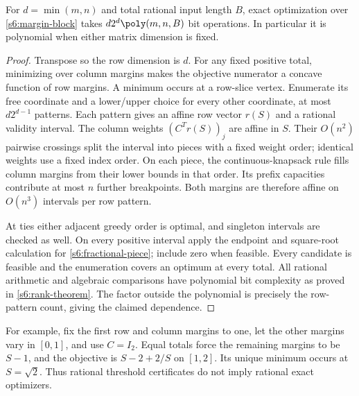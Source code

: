 \begin{theorem}\label{app:margin-fpt}
For $d=\min(m,n)$ and total rational input length $B$, exact optimization
over \eqref{s6:margin-block} takes
$d2^d\poly(m,n,B)$ bit operations. In particular it is polynomial
when either matrix dimension is fixed.
\end{theorem}
\begin{proof}
Transpose so the row dimension is $d$. For any fixed positive total,
minimizing over column margins makes the objective numerator a concave
function of row margins. A minimum occurs at a row-slice vertex.
Enumerate its free coordinate and a lower/upper choice for every other
coordinate, at most $d2^{d-1}$ patterns. Each pattern gives an affine
row vector $r(S)$ and a rational validity interval. The column weights
$(C^Tr(S))_j$ are affine in $S$. Their $O(n^2)$ pairwise crossings split
the interval into pieces with a fixed weight order; identical weights
use a fixed index order. On each piece, the continuous-knapsack rule
fills column margins from their lower bounds in that order. Its prefix
capacities contribute at most $n$ further breakpoints. Both margins
are therefore affine on $O(n^3)$ intervals per row pattern.

At ties either adjacent greedy order is optimal, and singleton intervals
are checked as well. On every positive interval apply the endpoint and
square-root calculation for \eqref{s6:fractional-piece}; include zero
when feasible. Every candidate is feasible and the enumeration covers
an optimum at every total. All rational arithmetic and algebraic
comparisons have polynomial bit complexity as proved in
\cref{s6:rank-theorem}. The factor outside the polynomial is precisely
the row-pattern count, giving the claimed dependence.
\end{proof}

For example, fix the first row and column margins to one, let the other
margins vary in $[0,1]$, and use $C=I_2$. Equal totals force the remaining
margins to be $S-1$, and the objective is $S-2+2/S$ on $[1,2]$.
Its unique minimum occurs at $S=\sqrt2$. Thus rational threshold
certificates do not imply rational exact optimizers.
